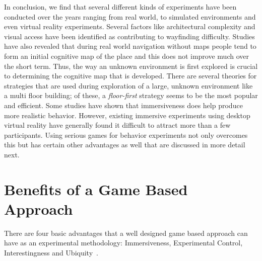 In conclusion, we find that several different kinds of experiments have been conducted over the years ranging from real world, to simulated environments and even virtual reality experiments. Several factors like architectural complexity and visual access have been identified as contributing to wayfinding difficulty. Studies have also revealed that during real world navigation without maps people tend to form an initial cognitive map of the place and this does not improve much over the short term. Thus, the way an unknown environment is first explored is crucial to determining the cognitive map that is developed. There are several theories for strategies that are used during exploration of a large, unknown environment like a multi floor building; of these, a \emph{floor-first} strategy seems to be the most popular and efficient. Some studies have shown that immersiveness does help produce more realistic behavior. However, existing immersive experiments using desktop virtual reality have generally found it difficult to attract more than a few participants. Using serious games for behavior experiments not only overcomes this but has certain other advantages as well that are discussed in more detail next.




\section{Benefits of a Game Based Approach} %
\label{sec:benefits_of_the_proposed_approach}

There are four basic advantages that a well designed game based approach can have as an experimental methodology: Immersiveness, Experimental Control, Interestingness and Ubiquity~\cite{Anonymous:2011ba}.

